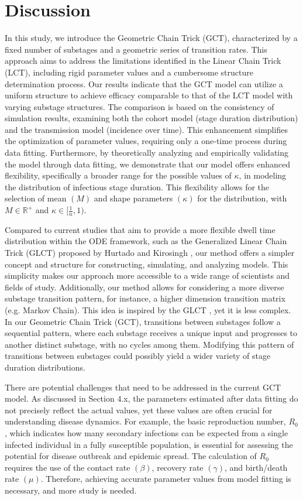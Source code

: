 \documentclass[12pt]{article}
\begin{document}
\section{Discussion}
In this study, we introduce the Geometric Chain Trick (GCT), characterized by a fixed number of substages and a geometric series of transition rates. This approach aims to address the limitations identified in the Linear Chain Trick (LCT), including rigid parameter values and a cumbersome structure determination process. Our results indicate that the GCT model can utilize a uniform structure to achieve efficacy comparable to that of the LCT model with varying substage structures. The comparison is based on the consistency of simulation results, examining both the cohort model (stage duration distribution) and the transmission model (incidence over time). This enhancement simplifies the optimization of parameter values, requiring only a one-time process during data fitting. Furthermore, by theoretically analyzing and empirically validating the model through data fitting, we demonstrate that our model offers enhanced flexibility, specifically a broader range for the possible values of $\kappa$, in modeling the distribution of infectious stage duration. This flexibility allows for the selection of mean $(M)$ and shape parameters $(\kappa)$ for the distribution, with $M \in \mathbb{R}^+$ and $\kappa \in [\frac{1}{n}, 1)$.

Compared to current studies that aim to provide a more flexible dwell time distribution within the ODE framework, such as the Generalized Linear Chain Trick (GLCT) proposed by Hurtado and Kirosingh \cite{hurtado2019generalizations}, our method offers a simpler concept and structure for constructing, simulating, and analyzing models. This simplicity makes our approach more accessible to a wide range of scientists and fields of study. Additionally, our method allows for considering a more diverse substage transition pattern, for instance, a higher dimension transition matrix (e.g. Markov Chain). This idea is inspired by the GLCT \cite{hurtado2019generalizations}\cite{hurtado2021building}, yet it is less complex. In our Geometric Chain Trick (GCT), transitions between substages follow a sequential pattern, where each substage receives a unique input and progresses to another distinct substage, with no cycles among them. Modifying this pattern of transitions between substages could possibly yield a wider variety of stage duration distributions.

There are potential challenges that need to be addressed in the current GCT model. As discussed in Section 4.x, the parameters estimated after data fitting do not precisely reflect the actual values, yet these values are often crucial for understanding disease dynamics. For example, the basic reproduction number, $R_0$, which indicates how many secondary infections can be expected from a single infected individual in a fully susceptible population, is essential for assessing the potential for disease outbreak and epidemic spread. The calculation of $R_0$ requires the use of the contact rate $(\beta)$, recovery rate $(\gamma)$, and birth/death rate $(\mu)$. Therefore, achieving accurate parameter values from model fitting is necessary, and more study is needed.
\end{document}
